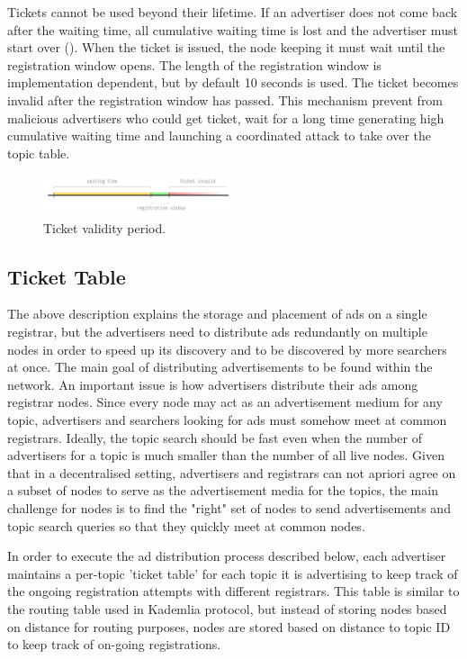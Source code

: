 Tickets cannot be used beyond their lifetime. If an advertiser does not come back after the waiting time, all cumulative waiting time is lost and the advertiser must start over (). When the ticket is issued, the node keeping it must wait until the registration window opens. The length of the registration window is implementation dependent, but by default 10 seconds is used. The ticket becomes invalid after the registration window has passed. This mechanism prevent from malicious advertisers who could get ticket, wait for a long time generating high cumulative waiting time and launching a coordinated attack to take over the topic table.
    
    
\begin{figure}
    \includegraphics[width=0.5\textwidth]{img/ticket-validity}
    \caption{Ticket validity period.}
    \label{fig:ticket_validity}
\end{figure}

\subsection{Ticket Table}
The above description explains the storage and placement of ads on a single registrar, but the advertisers need to distribute ads redundantly on multiple nodes in order to speed up its discovery and to be discovered by more searchers at once. The main goal of distributing advertisements to be found within the network. An important issue is how advertisers distribute their ads among registrar nodes. Since every node may act as an advertisement medium for any topic, advertisers and searchers looking for ads must somehow meet at common registrars. Ideally, the topic search should be fast even when the number of advertisers for a topic is much smaller than the number of all live nodes. Given that in a decentralised setting, advertisers and registrars can not apriori agree on a subset of nodes to serve as the advertisement media for the topics, the main challenge for nodes is to find the "right" set of nodes to send advertisements and topic search queries so that they quickly meet at common nodes.



In order to execute the ad distribution process described below, each advertiser maintains a per-topic 'ticket table' for each topic it is advertising to keep track of the ongoing registration attempts with different registrars. This table is similar to the routing table used in Kademlia protocol, but instead of storing nodes based on distance for routing purposes, nodes are stored based on distance to topic ID to keep track of on-going registrations.

